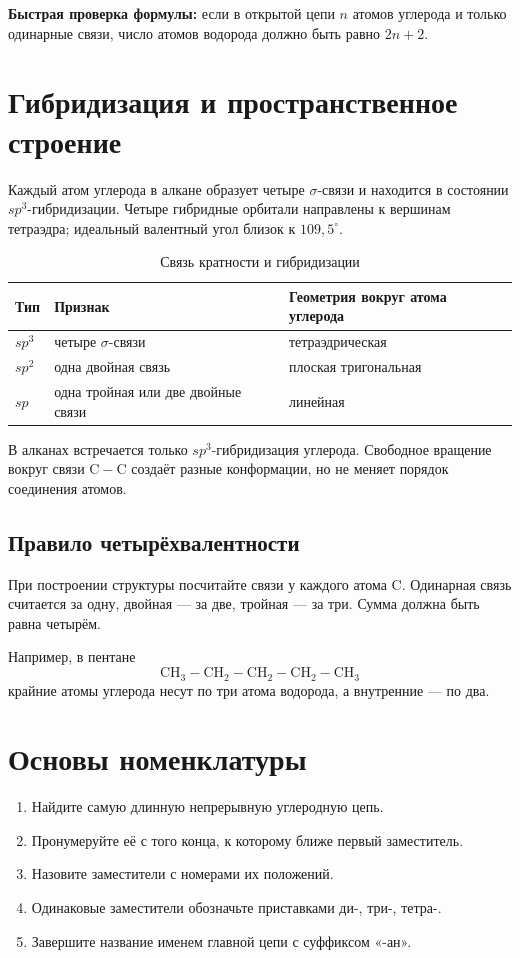 \documentclass[a4paper,12pt]{article}
\newcommand{\key}[1]{\textcolor{accent}{\textbf{#1}}}
\newcommand{\chem}[1]{\ensuremath{\mathrm{#1}}}
\begin{document}
\key{Быстрая проверка формулы:} если в открытой цепи $n$ атомов углерода и только одинарные связи, число атомов водорода должно быть равно $2n+2$.

\section{Гибридизация и пространственное строение}

Каждый атом углерода в алкане образует четыре $\sigma$-связи и находится в состоянии $sp^3$-гибридизации. Четыре гибридные орбитали направлены к вершинам тетраэдра; идеальный валентный угол близок к $109{,}5^\circ$.

\begin{table}[ht]
\centering
\caption{Связь кратности и гибридизации}
\begin{tabularx}{\linewidth}{>{\bfseries}p{28mm} p{36mm} X}
\toprule
Тип & Признак & Геометрия вокруг атома углерода \\
\midrule
$sp^3$ & четыре $\sigma$-связи & тетраэдрическая \\
$sp^2$ & одна двойная связь & плоская тригональная \\
$sp$ & одна тройная или две двойные связи & линейная \\
\bottomrule
\end{tabularx}
\end{table}

В алканах встречается только $sp^3$-гибридизация углерода. Свободное вращение вокруг связи \chem{C-C} создаёт разные конформации, но не меняет порядок соединения атомов.

\subsection{Правило четырёхвалентности}

При построении структуры посчитайте связи у каждого атома \chem{C}. Одинарная связь считается за одну, двойная --- за две, тройная --- за три. Сумма должна быть равна четырём.

Например, в пентане
\[
\chem{CH_3-CH_2-CH_2-CH_2-CH_3}
\]
крайние атомы углерода несут по три атома водорода, а внутренние --- по два.

\section{Основы номенклатуры}

\begin{enumerate}
  \item Найдите самую длинную непрерывную углеродную цепь.
  \item Пронумеруйте её с того конца, к которому ближе первый заместитель.
  \item Назовите заместители с номерами их положений.
  \item Одинаковые заместители обозначьте приставками ди-, три-, тетра-.
  \item Завершите название именем главной цепи с суффиксом «-ан».
\end{enumerate}
\end{document}
